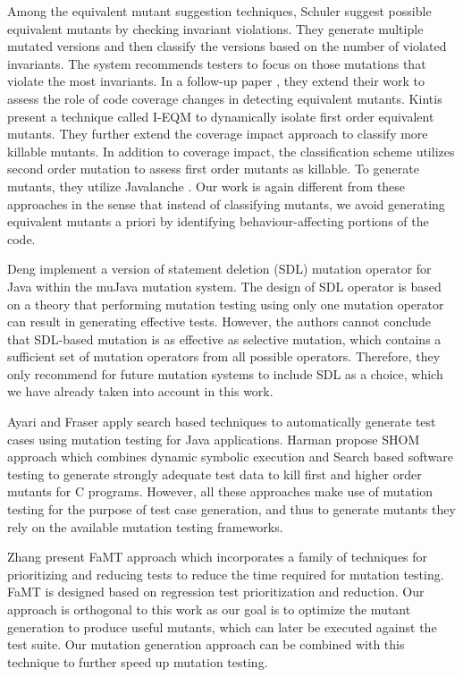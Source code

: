 Among the equivalent mutant suggestion techniques, Schuler \etal \cite{schuler:issta09} suggest possible equivalent mutants by checking invariant violations. They
generate multiple mutated versions and then classify the versions based on the number of violated invariants.
The system recommends testers to focus on those mutations that violate the most invariants.
In a follow-up paper \cite{schuler:tvr12}, they extend their work to assess the role of code coverage changes in detecting equivalent mutants. 
Kintis \etal \cite{kintis:icst12} present a technique called I-EQM to dynamically isolate first order equivalent mutants. They
further extend the coverage impact approach \cite{schuler:tvr12} to classify more killable mutants.  
In addition to coverage impact, the classification scheme utilizes second order mutation to assess first order mutants as killable. 
To generate mutants, they utilize Javalanche \cite{schuler:tvr12}.
Our work is again different from these approaches in the sense that instead of classifying mutants, 
we avoid generating equivalent mutants a priori by identifying behaviour-affecting portions of the code.

Deng \etal \cite{deng:icst13} implement a version of statement deletion (SDL) mutation operator for Java within the muJava mutation system. The design of SDL operator is based on a theory that performing mutation testing using only one mutation operator can result in generating effective tests. However, the authors cannot conclude that SDL-based mutation is as effective as selective mutation, which contains a sufficient set of mutation operators from all possible operators. Therefore, they only recommend for future mutation systems to include SDL as a choice, which we have already taken into account in this work.  

Ayari \etal \cite{ayari:gecco07} and Fraser \etal \cite{fraser:tse12} apply search based techniques to automatically generate test cases using mutation testing for Java applications. Harman \etal \cite{harman:fse11} propose SHOM approach which combines dynamic symbolic execution and Search based software testing to generate strongly adequate test data to kill first and higher order mutants for C programs. However, all these approaches make use of mutation testing for the purpose of test case generation, and thus to generate mutants they rely on the available mutation testing frameworks.

Zhang \etal \cite{zhang:issta13} present FaMT approach which incorporates a family
of techniques for prioritizing and reducing tests to reduce the time required for mutation
testing. FaMT is designed based on regression test prioritization and reduction. Our approach is orthogonal to this work as our goal is to optimize the mutant generation to produce useful mutants, which can later be executed against the test suite.
Our mutation generation approach can be combined with this technique to further speed up mutation testing.

